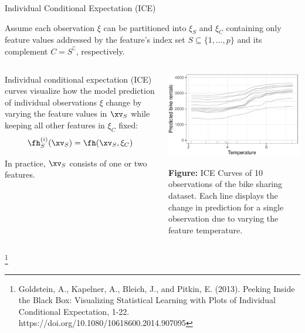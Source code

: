 \documentclass[11pt,compress,t,notes=noshow, xcolor=table]{beamer}
\begin{document}
\begin{vbframe}{Individual Conditional Expectation (ICE)}

Assume each observation $\xi$ can be partitioned into $\xi_S$ and $\xi_C$ containing only feature values addressed by the feature's index set $S \subseteq \{1, \dots, p\}$ and its complement $C = S^\complement$, respectively.

\lz

\begin{columns}[T, totalwidth=\textwidth]
\begin{column}{0.6\textwidth}
Individual conditional expectation (ICE) curves visualize how the model prediction of individual observations $\xi$
change by varying the feature values in $\xv_S$ while keeping all other features in $\xi_C$ fixed:
$$\fh_{S}^{(i)}(\xv_S) = \fh(\xv_S, \xi_C)$$

In practice, $\xv_S$ consists of one or two features.

\end{column}
\begin{column}{0.4\textwidth}
\centerline{\includegraphics[width=\textwidth]{figure_man/ice_bike10obs}}
\scriptsize{\textbf{Figure:} ICE Curves of 10 observations of the bike sharing dataset. Each line displays the change in prediction for a single observation due to varying the feature temperature.\par}

\end{column}
\end{columns}
\footnote[frame]{Goldstein, A., Kapelner, A., Bleich, J., and Pitkin, E. (2013). Peeking Inside the Black Box: Visualizing Statistical Learning with Plots of Individual Conditional Expectation, 1-22. https://doi.org/10.1080/10618600.2014.907095}
\end{vbframe}
\end{document}
